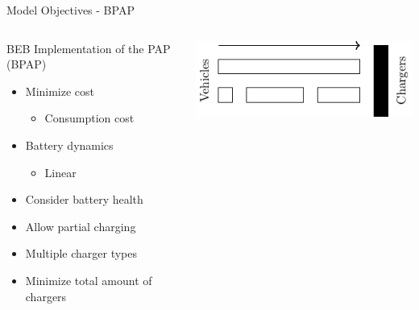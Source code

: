 \documentclass[aspectratio=169,dvipsnames]{beamer}
\begin{document}
\begin{frame}[label={sec:orgf23b743}]{Model Objectives - BPAP}
\begin{columns}
\begin{column}{0.5\columnwidth}
\begin{alertblock}{BEB Implementation of the PAP (BPAP)}
{\footnotesize
\begin{itemize}
\item Minimize cost
\begin{itemize}
\item Consumption cost
\end{itemize}
\item Battery dynamics
\begin{itemize}
\item Linear
\end{itemize}
\item Consider battery health
\item Allow partial charging
\item Multiple charger types
\item Minimize total amount of chargers
\end{itemize}
}
\end{alertblock}
\end{column}

\begin{column}{0.5\columnwidth}
\begin{center}
\includegraphics[width=.9\linewidth]{./img/pap.pdf}
\end{center}
\end{column}
\end{columns}
\end{frame}
\end{document}
